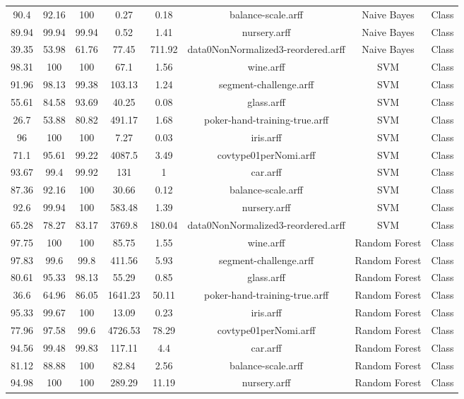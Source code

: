 \begin{longtable}{@{\extracolsep{}}cccccccc}
90.4	&	92.16	&	100	&	0.27	&	0.18	&	 balance-scale.arff	&	 Naive Bayes	&	Class	\\
89.94	&	99.94	&	99.94	&	0.52	&	1.41	&	 nursery.arff	&	 Naive Bayes	&	Class	\\
39.35	&	53.98	&	61.76	&	77.45	&	711.92	&	 data0NonNormalized3-reordered.arff	&	 Naive Bayes	&	Class	\\
98.31	&	100	&	100	&	67.1	&	1.56	&	 wine.arff	&	 SVM	&	Class	\\
91.96	&	98.13	&	99.38	&	103.13	&	1.24	&	 segment-challenge.arff	&	 SVM	&	Class	\\
55.61	&	84.58	&	93.69	&	40.25	&	0.08	&	 glass.arff	&	 SVM	&	Class	\\
26.7	&	53.88	&	80.82	&	491.17	&	1.68	&	 poker-hand-training-true.arff	&	 SVM	&	Class	\\
96	&	100	&	100	&	7.27	&	0.03	&	 iris.arff	&	 SVM	&	Class	\\
71.1	&	95.61	&	99.22	&	4087.5	&	3.49	&	 covtype01perNomi.arff	&	 SVM	&	Class	\\
93.67	&	99.4	&	99.92	&	131	&	1	&	 car.arff	&	 SVM	&	Class	\\
87.36	&	92.16	&	100	&	30.66	&	0.12	&	 balance-scale.arff	&	 SVM	&	Class	\\
92.6	&	99.94	&	100	&	583.48	&	1.39	&	 nursery.arff	&	 SVM	&	Class	\\
65.28	&	78.27	&	83.17	&	3769.8	&	180.04	&	 data0NonNormalized3-reordered.arff	&	 SVM	&	Class	\\
97.75	&	100	&	100	&	85.75	&	1.55	&	 wine.arff	&	 Random Forest	&	Class	\\
97.83	&	99.6	&	99.8	&	411.56	&	5.93	&	 segment-challenge.arff	&	 Random Forest	&	Class	\\
80.61	&	95.33	&	98.13	&	55.29	&	0.85	&	 glass.arff	&	 Random Forest	&	Class	\\
36.6	&	64.96	&	86.05	&	1641.23	&	50.11	&	 poker-hand-training-true.arff	&	 Random Forest	&	Class	\\
95.33	&	99.67	&	100	&	13.09	&	0.23	&	 iris.arff	&	 Random Forest	&	Class	\\
77.96	&	97.58	&	99.6	&	4726.53	&	78.29	&	 covtype01perNomi.arff	&	 Random Forest	&	Class	\\
94.56	&	99.48	&	99.83	&	117.11	&	4.4	&	 car.arff	&	 Random Forest	&	Class	\\
81.12	&	88.88	&	100	&	82.84	&	2.56	&	 balance-scale.arff	&	 Random Forest	&	Class	\\
94.98	&	100	&	100	&	289.29	&	11.19	&	 nursery.arff	&	 Random Forest	&	Class	\\

\end{longtable}
